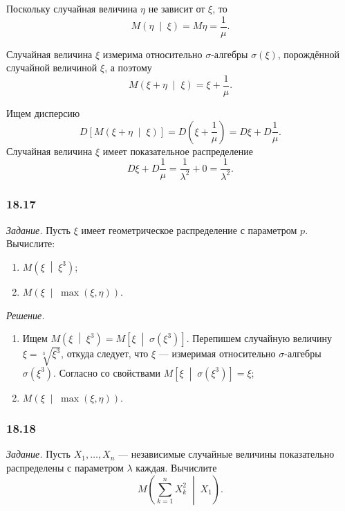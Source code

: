 Поскольку случайная величина $ \eta $ не зависит от $ \xi $, то
$$M \left( \eta \; \middle| \; \xi \right) =
  M \eta =
  \frac{1}{ \mu }.$$

Случайная величина $ \xi $ измерима относительно $ \sigma $-алгебры $ \sigma \left( \xi \right) $,
порождённой случайной величиной $ \xi $, а поэтому
$$M \left( \xi + \eta \; \middle| \; \xi \right) =
  \xi + \frac{1}{ \mu }.$$

Ищем дисперсию
$$D \left[ M \left( \xi + \eta \; \middle| \; \xi \right) \right] =
  D \left( \xi + \frac{1}{ \mu } \right) =
  D \xi + D \frac{1}{ \mu }.$$
Случайная величина $ \xi $ имеет показательное распределение
$$D \xi + D \frac{1}{ \mu } =
  \frac{1}{ \lambda^2} + 0 =
  \frac{1}{ \lambda^2}.$$

\subsubsection*{18.17}

\textit{Задание.} Пусть $ \xi $ имеет геометрическое распределение с параметром $p$.
Вычислите:
\begin{enumerate}[label=\alph*)]
  \item $M \left( \xi \; \middle| \; \xi^3 \right) $;
  \item $M \left( \xi \; \middle| \; \max \left( \xi, \eta \right) \right) $.
\end{enumerate}

\textit{Решение.}
\begin{enumerate}[label=\alph*)]
  \item Ищем
  $M \left( \xi \; \middle| \; \xi^3 \right) =
    M \left[ \xi \; \middle| \; \sigma \left( \xi^3 \right) \right] $.
  Перепишем случайную величину $ \xi = \sqrt[3]{ \xi^3}$, откуда следует, что $ \xi $ ---
  измеримая относительно $ \sigma $-алгебры $ \sigma \left( \xi^3 \right) $.
  Согласно со свойствами $M \left[ \xi \; \middle| \; \sigma \left( \xi^3 \right) \right] = \xi $;
  \item $M \left( \xi \; \middle| \; \max \left( \xi, \eta \right) \right) $.
\end{enumerate}

\subsubsection*{18.18}

\textit{Задание.}
Пусть $X_1, \dotsc, X_n$ ---
независимые случайные величины показательно распределены с параметром $ \lambda $ каждая.
Вычислите
$$M \left( \sum \limits_{k = 1}^n X_k^2 \; \middle| \; X_1 \right).$$

